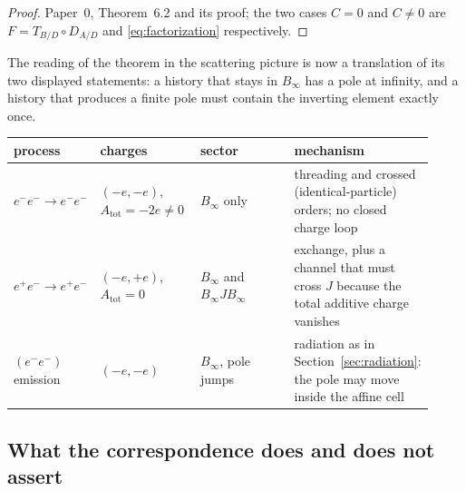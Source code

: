\begin{proof}
Paper~0, Theorem~6.2 and its proof; the two cases $C=0$ and $C\ne0$ are
$F=T_{B/D}\circ D_{A/D}$ and \eqref{eq:factorization} respectively.
\end{proof}

The reading of the theorem in the scattering picture is now a translation of its
two displayed statements: a history that stays in $B_\infty$ has a pole at
infinity, and a history that produces a finite pole must contain the inverting
element exactly once.

\begin{center}\small
\renewcommand{\arraystretch}{1.25}
\begin{tabular}{@{}p{0.2\linewidth}p{0.24\linewidth}p{0.24\linewidth}p{0.24\linewidth}@{}}
\toprule
process & charges & \AEG{} sector & mechanism \\
\midrule
$e^-e^-\to e^-e^-$ & $(-e,-e)$, $A_{\mathrm{tot}}=-2e\ne0$
& $B_\infty$ only & threading and crossed (identical-particle) orders; no closed
charge loop \\
$e^+e^-\to e^+e^-$ & $(-e,+e)$, $A_{\mathrm{tot}}=0$
& $B_\infty$ and $B_\infty JB_\infty$ & exchange, plus a channel that must cross
$J$ because the total additive charge vanishes \\
$(e^-e^-)$ emission & $(-e,-e)$ & $B_\infty$, pole jumps
& radiation as in Section~\ref{sec:radiation}: the pole may move inside the
affine cell \\
\bottomrule
\end{tabular}
\end{center}

\subsection{What the correspondence does and does not assert}

